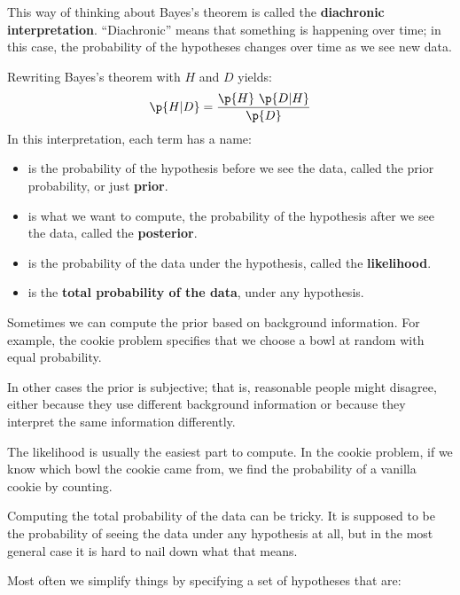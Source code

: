 \documentclass[12pt]{book}
\theoremstyle{exercise}
\begin{document}

This way of thinking about Bayes's theorem is called the
{\bf diachronic interpretation}.  ``Diachronic'' means that something
is happening over time; in this case, the probability of the hypotheses changes over time as we see new data.

Rewriting Bayes's theorem with $H$ and $D$ yields:
%
\[ \p{H|D} = \frac{\p{H}~\p{D|H}}{\p{D}} \]
%
In this interpretation, each term has a name:


\begin{itemize}

\item {} is the probability of the hypothesis before we see
the data, called the prior probability, or just {\bf prior}.

\item {} is what we want to compute, the probability of
the hypothesis after we see the data, called the {\bf posterior}.

\item {} is the probability of the data under the hypothesis,
called the {\bf likelihood}.

\item {} is the {\bf total probability of the data}, under any hypothesis.

\end{itemize}

Sometimes we can compute the prior based on background information.  For example, the cookie problem specifies that we choose a bowl at random with equal probability.

In other cases the prior is subjective; that is, reasonable people
might disagree, either because they use different background
information or because they interpret the same information
differently.


The likelihood is usually the easiest part to compute.  In the
cookie problem, if we know which bowl the cookie came from,
we find the probability of a vanilla cookie by counting.

Computing the total probability of the data can be tricky.  It is supposed to be the probability of seeing the data under any hypothesis at all, but in the most general case it is hard to nail down what that means.

Most often we simplify things by specifying a set of hypotheses
that are:
\end{document}
